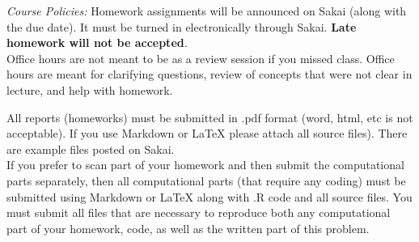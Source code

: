 \documentclass[11pt]{article}
\begin{document}
%
%
%


\vspace{0.4cm}


\emph{Course Policies:} 
Homework assignments will be announced on Sakai (along with the due date). It must be turned in electronically through Sakai. \textbf{Late homework will not be accepted}.\\

Office hours are not meant to be as a review session if you missed class. Office hours are meant for clarifying questions, review of concepts that were not clear in lecture, and help with homework. \\

\newpage

All reports (homeworks) must be submitted in .pdf format (word, html, etc is not acceptable). If you use Markdown or LaTeX please attach all source files). There are example files posted on Sakai. \\

If you prefer to scan part of your homework and then submit the computational parts separately, then all computational parts (that require any coding) must be submitted using Markdown or LaTeX along with .R code and all source files.  You must submit all files that are necessary to reproduce both any computational part of your homework, code, as well as the written part of this problem. 
\end{document}
